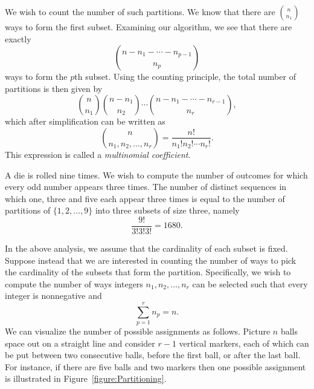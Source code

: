 We wish to count the number of such partitions.
We know that there are $\binom{n}{n_1}$ ways to form the first subset.
Examining our algorithm, we see that there are exactly
\begin{equation*}
\binom{n - n_1 - \cdots - n_{p-1}}{n_p}
\end{equation*}
ways to form the $p$th subset.
Using the counting principle, the total number of partitions is then given by
\begin{equation*}
\binom{n}{n_1} \binom{n - n_1}{n_2}
\cdots \binom{n - n_1 - \cdots - n_{r-1}}{n_r},
\end{equation*}
which after simplification can be written as
\begin{equation*}
\binom{n}{n_1, n_2, \ldots, n_r}
= \frac{n!}{n_1! n_2! \cdots n_r!} .
\end{equation*}
This expression is called a \emph{multinomial coefficient}. 

\begin{example}
A die is rolled nine times.
We wish to compute the number of outcomes for which every odd number appears three times.
The number of distinct sequences in which one, three and five each appear three times is equal to the number of partitions of $\{ 1, 2, \ldots, 9 \}$ into three subsets of size three, namely
\begin{equation*}
\frac{9!}{3! 3! 3!} = 1680 .
\end{equation*}
\end{example}

In the above analysis, we assume that the cardinality of each subset is fixed.
Suppose instead that we are interested in counting the number of ways to pick the cardinality of the subsets that form the partition. 
Specifically, we wish to compute the number of ways integers $n_1, n_2, \ldots, n_r$ can be selected such that every integer is nonnegative and
\begin{equation*}
\sum_{p = 1}^r n_p = n.
\end{equation*}
We can visualize the number of possible assignments as follows.
Picture $n$ balls space out on a straight line and consider $r-1$ vertical markers, each of which can be put between two consecutive balls, before the first ball, or after the last ball. 
For instance, if there are five balls and two markers then one possible assignment is illustrated in Figure~\ref{figure:Partitioning}.

